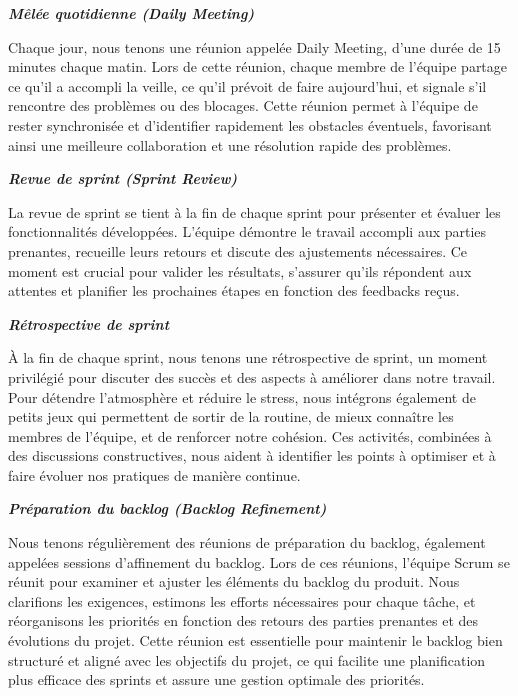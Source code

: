 \textbf{\textbullet \textit{Mêlée quotidienne (Daily Meeting)}}

Chaque jour, nous tenons une réunion appelée Daily Meeting, d'une durée de 15 minutes chaque matin. Lors de cette réunion, chaque membre de l'équipe partage ce qu'il a accompli la veille, ce qu'il prévoit de faire aujourd'hui, et signale s'il rencontre des problèmes ou des blocages. Cette réunion permet à l'équipe de rester synchronisée et d'identifier rapidement les obstacles éventuels, favorisant ainsi une meilleure collaboration et une résolution rapide des problèmes.

\textbf{\textbullet \textit{Revue de sprint (Sprint Review) }}

La revue de sprint se tient à la fin de chaque sprint pour présenter et évaluer les fonctionnalités développées. L'équipe démontre le travail accompli aux parties prenantes, recueille leurs retours et discute des ajustements nécessaires. Ce moment est crucial pour valider les résultats, s'assurer qu'ils répondent aux attentes et planifier les prochaines étapes en fonction des feedbacks reçus.

\textbf{\textbullet \textit{Rétrospective de sprint }}

À la fin de chaque sprint, nous tenons une rétrospective de sprint, un moment privilégié pour discuter des succès et des aspects à améliorer dans notre travail. Pour détendre l'atmosphère et réduire le stress, nous intégrons également de petits jeux qui permettent de sortir de la routine, de mieux connaître les membres de l'équipe, et de renforcer notre cohésion. Ces activités, combinées à des discussions constructives, nous aident à identifier les points à optimiser et à faire évoluer nos pratiques de manière continue.

\textbf{\textbullet \textit{Préparation du backlog (Backlog Refinement) }}

Nous tenons régulièrement des réunions de préparation du backlog, également appelées sessions d'affinement du backlog. Lors de ces réunions, l'équipe Scrum se réunit pour examiner et ajuster les éléments du backlog du produit. Nous clarifions les exigences, estimons les efforts nécessaires pour chaque tâche, et réorganisons les priorités en fonction des retours des parties prenantes et des évolutions du projet. Cette réunion est essentielle pour maintenir le backlog bien structuré et aligné avec les objectifs du projet, ce qui facilite une planification plus efficace des sprints et assure une gestion optimale des priorités.


